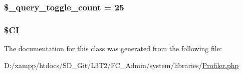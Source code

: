 \subsubsection[{\$\+\_\+query\+\_\+toggle\+\_\+count}]{\setlength{\rightskip}{0pt plus 5cm}\$\+\_\+query\+\_\+toggle\+\_\+count = 25\hspace{0.3cm}{\ttfamily [protected]}}\label{class_c_i___profiler_a950aa6662ddde22ba9c05adffd6a20c9}
\hypertarget{class_c_i___profiler_ae0314d046ddf7fcfaec03222977427d3}{}
\subsubsection[{\$\+C\+I}]{\setlength{\rightskip}{0pt plus 5cm}\$C\+I\hspace{0.3cm}{\ttfamily [protected]}}\label{class_c_i___profiler_ae0314d046ddf7fcfaec03222977427d3}


The documentation for this class was generated from the following file\+:\begin{DoxyCompactItemize}
\item 
D\+:/xampp/htdocs/\+S\+D\+\_\+\+Git/\+L3\+T2/\+F\+C\+\_\+\+Admin/system/libraries/\hyperlink{system_2libraries_2profiler_8php}{Profiler.\+php}\end{DoxyCompactItemize}
